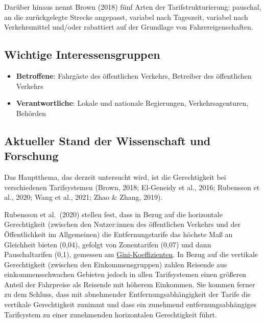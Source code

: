 \documentclass[
]{book}
\providecommand{\tightlist}{%
  \setlength{\itemsep}{0pt}\setlength{\parskip}{0pt}}
\begin{document}
Darüber hinaus nennt Brown (2018) fünf Arten der Tarifstrukturierung: pauschal, an die zurückgelegte Strecke angepasst, variabel nach Tageszeit, variabel nach Verkehrsmittel und/oder rabattiert auf der Grundlage von Fahrereigenschaften.

\hypertarget{wichtige-interessensgruppen-23}{%
\subsection*{Wichtige Interessensgruppen}\label{wichtige-interessensgruppen-23}}

\begin{itemize}
\tightlist
\item
  \textbf{Betroffene}: Fahrgäste des öffentlichen Verkehrs, Betreiber des öffentlichen Verkehrs
\item
  \textbf{Verantwortliche}: Lokale und nationale Regierungen, Verkehrsagenturen, Behörden
\end{itemize}

\hypertarget{aktueller-stand-der-wissenschaft-und-forschung-23}{%
\subsection*{Aktueller Stand der Wissenschaft und Forschung}\label{aktueller-stand-der-wissenschaft-und-forschung-23}}

Das Hauptthema, das derzeit untersucht wird, ist die Gerechtigkeit bei verschiedenen Tarifsystemen (Brown, 2018; El-Geneidy et al., 2016; Rubensson et al., 2020; Wang et al., 2021; Zhao \& Zhang, 2019).

Rubensson et al.~(2020) stellen fest, dass in Bezug auf die horizontale Gerechtigkeit (zwischen den Nutzer:innen des öffentlichen Verkehrs und der Öffentlichkeit im Allgemeinen) die Entfernungstarife das höchste Maß an Gleichheit bieten (0,04), gefolgt von Zonentarifen (0,07) und dann Pauschaltarifen (0,1), gemessen am \href{https://www.univie.ac.at/sowi-online/esowi/cp/einfsoz/einfsoz-55.html}{Gini-Koeffizienten}. In Bezug auf die vertikale Gerechtigkeit (zwischen den Einkommensgruppen) zahlen Reisende aus einkommensschwachen Gebieten jedoch in allen Tarifsystemen einen größeren Anteil der Fahrpreise als Reisende mit höherem Einkommen. Sie kommen ferner zu dem Schluss, dass mit abnehmender Entfernungsabhängigkeit der Tarife die vertikale Gerechtigkeit zunimmt und dass ein zunehmend entfernungsabhängiges Tarifsystem zu einer zunehmenden horizontalen Gerechtigkeit führt.
\end{document}

